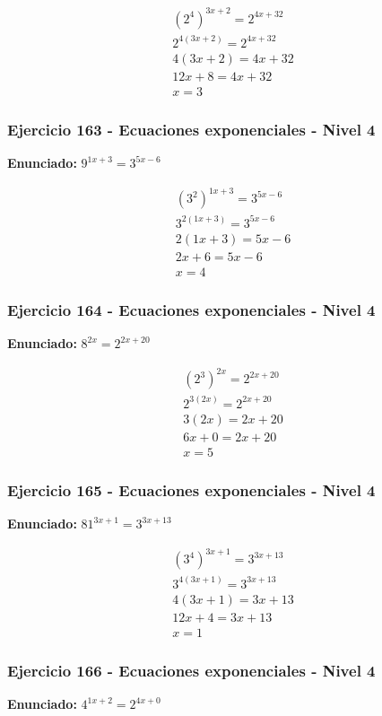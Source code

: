 \documentclass[12pt,a4paper]{article}
\begin{document}
\[
\begin{aligned}
(2^{4})^{3x+2}=2^{4x+32}\\
2^{4(3x+2)}=2^{4x+32}\\
4(3x+2)=4x+32\\
12x+8=4x+32\\
\boxed{x=3}
\end{aligned}
\]


\subsubsection*{Ejercicio 163 - Ecuaciones exponenciales - Nivel 4}
\textbf{Enunciado:} \(9^{1x+3}=3^{5x-6}\)

\[
\begin{aligned}
(3^{2})^{1x+3}=3^{5x-6}\\
3^{2(1x+3)}=3^{5x-6}\\
2(1x+3)=5x-6\\
2x+6=5x-6\\
\boxed{x=4}
\end{aligned}
\]


\subsubsection*{Ejercicio 164 - Ecuaciones exponenciales - Nivel 4}
\textbf{Enunciado:} \(8^{2x}=2^{2x+20}\)

\[
\begin{aligned}
(2^{3})^{2x}=2^{2x+20}\\
2^{3(2x)}=2^{2x+20}\\
3(2x)=2x+20\\
6x+0=2x+20\\
\boxed{x=5}
\end{aligned}
\]


\subsubsection*{Ejercicio 165 - Ecuaciones exponenciales - Nivel 4}
\textbf{Enunciado:} \(81^{3x+1}=3^{3x+13}\)

\[
\begin{aligned}
(3^{4})^{3x+1}=3^{3x+13}\\
3^{4(3x+1)}=3^{3x+13}\\
4(3x+1)=3x+13\\
12x+4=3x+13\\
\boxed{x=1}
\end{aligned}
\]


\subsubsection*{Ejercicio 166 - Ecuaciones exponenciales - Nivel 4}
\textbf{Enunciado:} \(4^{1x+2}=2^{4x+0}\)
\end{document}
